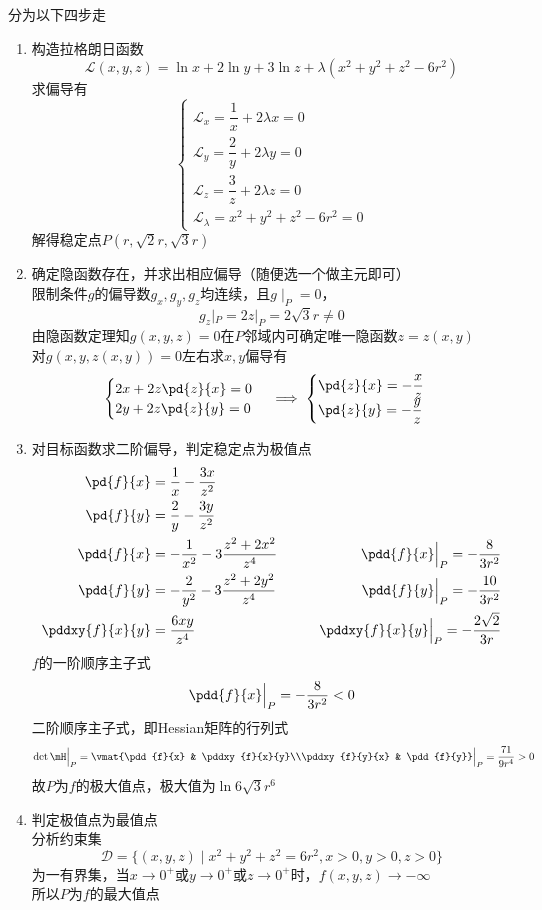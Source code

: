 \begin{analysis}
分为以下四步走
\begin{enumerate}
\item 构造拉格朗日函数
\[\mathcal{L}(x,y,z)=\ln x+2\ln y+3\ln z+\lambda(x^2+y^2+z^2-6r^2)\]
求偏导有
\[\begin{cases}
\mathcal{L}_x=\dfrac{1}{x}+2\lambda x=0\\
\mathcal{L}_y=\dfrac{2}{y}+2\lambda y=0\\
\mathcal{L}_z=\dfrac{3}{z}+2\lambda z=0\\
\mathcal{L}_\lambda=x^2+y^2+z^2-6r^2=0
\end{cases}\]
解得稳定点$P(r,\sqrt{2}r,\sqrt{3}r)$
\item 确定隐函数存在，并求出相应偏导（随便选一个做主元即可）\\
限制条件$g$的偏导数$g_x,g_y,g_z$均连续，且$g\mid_P=0$，
\[g_z|_{P}=2z|_{P}=2\sqrt{3}r\ne 0\]
由隐函数定理知$g(x,y,z)=0$在$P$邻域内可确定唯一隐函数$z=z(x,y)$\\
对$g(x,y,z(x,y))=0$左右求$x,y$偏导有
\[\begin{cases}
2x+2z\pd{z}{x}=0\\
2y+2z\pd{z}{y}=0
\end{cases}
\implies
\begin{cases}
\pd{z}{x}=-\dfrac{x}{z}\\
\pd{z}{y}=-\dfrac{y}{z}
\end{cases}\]
\item 对目标函数求二阶偏导，判定稳定点为极值点
\[\begin{aligned}
\pd{f}{x}&=\frac{1}{x}-\frac{3x}{z^2}\qquad&\\
\pd{f}{y}&=\frac{2}{y}-\frac{3y}{z^2}\qquad&\\
\pdd{f}{x}&=-\frac{1}{x^2}-3\frac{z^2+2x^2}{z^4}\qquad& \pdd{f}{x}\Big|_P=-\frac{8}{3r^2}\\
\pdd{f}{y}&=-\frac{2}{y^2}-3\frac{z^2+2y^2}{z^4}\qquad& \pdd{f}{y}\Big|_P=-\frac{10}{3r^2}\\
\pddxy{f}{x}{y}&=\frac{6xy}{z^4}\qquad& \pddxy{f}{x}{y}\Big|_P=-\frac{2\sqrt{2}}{3r}
\end{aligned}\]
$f$的一阶顺序主子式
\[\pdd{f}{x}\Big|_P=-\frac{8}{3r^2}<0\]
二阶顺序主子式，即Hessian矩阵的行列式
\[\det\mH\Big|_P=\vmat{\pdd{f}{x} & \pddxy{f}{x}{y}\\\pddxy{f}{y}{x} & \pdd{f}{y}}\Big|_P=\frac{71}{9r^4}>0\]
故$P$为$f$的极大值点，极大值为$\ln 6\sqrt{3}r^6$
\item 判定极值点为最值点\\
分析约束集
\[\mathcal{D}=\{(x,y,z)\mid x^2+y^2+z^2=6r^2,x>0,y>0,z>0\}\]
为一有界集，当$x\to 0^+$或$y\to 0^+$或$z\to 0^+$时，$f(x,y,z)\to -\infty$\\
所以$P$为$f$的最大值点
\end{enumerate}
\end{analysis}